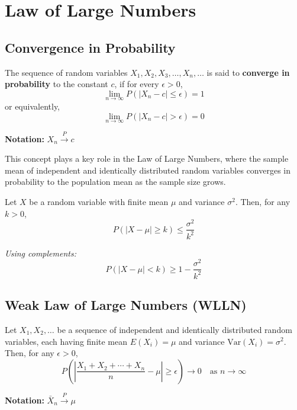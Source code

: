 \chapter{Law of Large Numbers}
\section{Convergence in Probability}

\vspace{1em}


\begin{definition}
The sequence of random variables \( X_1, X_2, X_3, \ldots, X_n, \ldots \) is said to \textbf{converge in probability} to the constant \( c \), if for every \( \epsilon > 0 \),
\[
\lim_{n \to \infty} P\left( |X_n - c| \leq \epsilon \right) = 1
\]
or equivalently,
\[
\lim_{n \to \infty} P\left( |X_n - c| > \epsilon \right) = 0
\]

\noindent \textbf{Notation:} \( X_n \xrightarrow{P} c \)
\end{definition}

\vspace{1em}

This concept plays a key role in the Law of Large Numbers, where the sample mean of independent and identically distributed random variables converges in probability to the population mean as the sample size grows.

\vspace{2em}

\begin{definition}
Let \( X \) be a random variable with finite mean \( \mu \) and variance \( \sigma^2 \). Then, for any \( k > 0 \),
\[
P\left( |X - \mu| \geq k \right) \leq \frac{\sigma^2}{k^2}
\]

\textit{Using complements:}
\[
P\left( |X - \mu| < k \right) \geq 1 - \frac{\sigma^2}{k^2}
\]
\end{definition}

\newpage

\section{Weak Law of Large Numbers (WLLN)}

\begin{definition}
Let \( X_1, X_2, \ldots \) be a sequence of independent and identically distributed random variables, each having finite mean \( E(X_i) = \mu \) and variance \( \mathrm{Var}(X_i) = \sigma^2 \). Then, for any \( \epsilon > 0 \),
\[
P\left( \left| \frac{X_1 + X_2 + \cdots + X_n}{n} - \mu \right| \geq \epsilon \right) \to 0 \quad \text{as } n \to \infty
\]

\noindent\textbf{Notation:} \( \bar{X}_n \xrightarrow{P} \mu \)
\end{definition}

